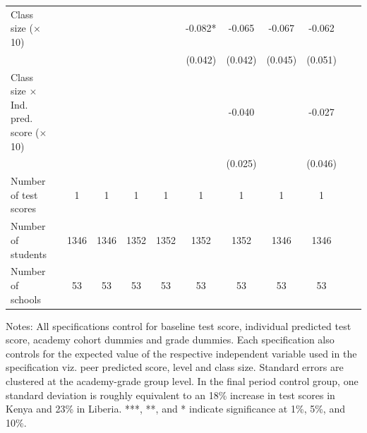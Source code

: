 \begin{center}
\begin{scriptsize}
\begin{threeparttable}
\begin{tabular} {@{} l l c c c c c c c c c c  @{}}
Class size ($\times$ 10) &  &  &  &  &  & -0.082* & -0.065 & -0.067 & -0.062 \\
                 &  &  &  &  &  & (0.042) & (0.042) & (0.045) & (0.051) \\
Class size $\times$ Ind. pred. score ($\times$ 10) &  &  &  &  &  &  & -0.040 &  & -0.027 \\
                 &  &  &  &  &  &  & (0.025) &  & (0.046) \\
\midrule
Number of test scores &  & 1 & 1 & 1 & 1 & 1 & 1 & 1 & 1 \\
Number of students &  & 1346 & 1346 & 1352 & 1352 & 1352 & 1352 & 1346 & 1346 \\
Number of schools &  & 53 & 53 & 53 & 53 & 53 & 53 & 53 & 53 \\
\bottomrule
\end{tabular}
\begin{tablenotes}
\item Notes: All specifications control for baseline test score, individual predicted test score, academy cohort dummies and grade dummies. Each specification also controls for the expected value of the respective independent variable used in the specification viz. peer predicted score, level and class size. Standard errors are clustered at the academy-grade group level. In the final period control group, one standard deviation is roughly equivalent to an 18\% increase in test scores in Kenya and 23\% in Liberia. ***, **, and * indicate significance at 1\%, 5\%, and 10\%.\end{tablenotes}
\end{threeparttable}
\end{scriptsize}
\end{center}
\clearpage
